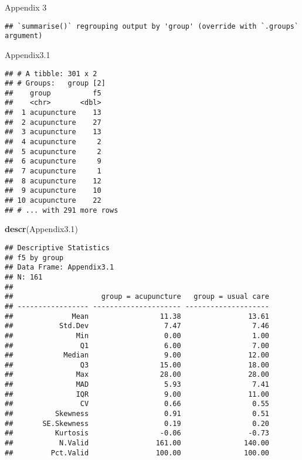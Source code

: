 \documentclass[
]{article}
\newenvironment{Shaded}{\begin{snugshade}}{\end{snugshade}}
\newcommand{\FloatTok}[1]{\textcolor[rgb]{0.00,0.00,0.81}{#1}}
\newcommand{\KeywordTok}[1]{\textcolor[rgb]{0.13,0.29,0.53}{\textbf{#1}}}
\newcommand{\NormalTok}[1]{#1}
\newcommand{\OperatorTok}[1]{\textcolor[rgb]{0.81,0.36,0.00}{\textbf{#1}}}
\newcommand{\StringTok}[1]{\textcolor[rgb]{0.31,0.60,0.02}{#1}}
\begin{document}
Appendix 3

\begin{Shaded}
\end{Shaded}

\begin{verbatim}
## `summarise()` regrouping output by 'group' (override with `.groups` argument)
\end{verbatim}

\begin{Shaded}
\begin{Highlighting}[]
\NormalTok{Appendix3}\FloatTok{.1}
\end{Highlighting}
\end{Shaded}

\begin{verbatim}
## # A tibble: 301 x 2
## # Groups:   group [2]
##    group          f5
##    <chr>       <dbl>
##  1 acupuncture    13
##  2 acupuncture    27
##  3 acupuncture    13
##  4 acupuncture     2
##  5 acupuncture     2
##  6 acupuncture     9
##  7 acupuncture     1
##  8 acupuncture    12
##  9 acupuncture    10
## 10 acupuncture    22
## # ... with 291 more rows
\end{verbatim}

\begin{Shaded}
\begin{Highlighting}[]
\KeywordTok{descr}\NormalTok{(Appendix3}\FloatTok{.1}\NormalTok{)}
\end{Highlighting}
\end{Shaded}

\begin{verbatim}
## Descriptive Statistics  
## f5 by group  
## Data Frame: Appendix3.1  
## N: 161  
## 
##                     group = acupuncture   group = usual care
## ----------------- --------------------- --------------------
##              Mean                 11.38                13.61
##           Std.Dev                  7.47                 7.46
##               Min                  0.00                 1.00
##                Q1                  6.00                 7.00
##            Median                  9.00                12.00
##                Q3                 15.00                18.00
##               Max                 28.00                28.00
##               MAD                  5.93                 7.41
##               IQR                  9.00                11.00
##                CV                  0.66                 0.55
##          Skewness                  0.91                 0.51
##       SE.Skewness                  0.19                 0.20
##          Kurtosis                 -0.06                -0.73
##           N.Valid                161.00               140.00
##         Pct.Valid                100.00               100.00
\end{verbatim}
\end{document}

